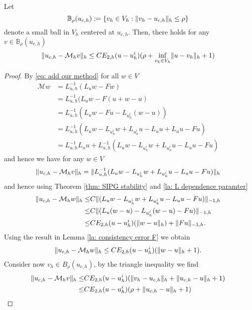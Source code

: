 \begin{lemma} \label{la: mapping property of M}
	Let 
	\[
		\mathbb B_\rho(u_{c,h}):=\{v_h \in V_h: \lVert v_h - u_{c,h} \rVert_{h} \leq \rho\}
	\]
	denote a small ball in $V_h$ centered at $u_{c,h}$. 
	Then, there holds for any $v \in \mathbb B_\rho(u_{c,h})$
	\[
		\lVert u_{c,h} - \mathcal M_h v \rVert_{h} \leq C E_{2,h}(u - u^i_h) (\rho+ \inf_{v_h \in V_h} \lVert u-v_h \rVert_{h}+1)
	\] 
\end{lemma}
\begin{proof}
By \eqref{eq: add our method} for all $w \in V$
\begin{align}
	\mathcal M w &= L_{u,h}^{-1}(L_u w - Fw) \nonumber\\
				 &= L_{u,h}^{-1}(L_u w - F(u+w-u) \nonumber\\
				 &= L_{u,h}^{-1}(L_u w - Fu - L_{u^i_h} (w-u)) \nonumber\\
				 &=  L_{u,h}^{-1}(L_u w - L_{u^i_h} w + L_{u^i_h}u - L_u u + L_u u - Fu) \nonumber\\
				 & = L_{u,h}^{-1} L_u u + L_{u,h}^{-1}(L_u w - L_{u^i_h} w + L_{u^i_h}u - L_u u - Fu) \label{eq: expand M}
 \end{align}	
 and hence we have for any $w \in V$
	\begin{align}
		\lVert u_{c,h} - \mathcal M_h v \rVert_{h} = \lVert L_{u,h}^{-1}(L_u w - L_{u^i_h} w + L_{u^i_h}u - L_u u - Fu) \rVert_{h}
	\end{align}
	and hence using Theorem \ref{thm: SIPG stability} and \ref{la: L dependence paramter}
	\begin{align*}
		\lVert u_{c,h} - \mathcal M_h w \rVert_{h} 
		\leq& C\lVert (L_u w - L_{u^i_h} w + L_{u^i_h} u- L_u u - Fu) \rVert_{-1,h} \nonumber\\
		\leq& C\lVert (L_u (w-u) - L_{u^i_h} (w-u) - Fu) \rVert_{-1,h} \nonumber\\
				\leq& C E_{2,h}(u - u^i_h) (\lVert w-u \rVert_{h}) +\lVert Fu \rVert_{-1,h}.
	\end{align*}
	Using the result in Lemma \ref{la: consistency error F} we obtain
	\begin{align*}
		\lVert u_{c,h} - \mathcal M_h w \rVert_{h} \leq C E_{2,h}(u - u^i_h) (\lVert w-u \rVert_{h}+1).
	\end{align*}
	Consider now $v_h \in B_\rho(u_{c,h})$, by the triangle inequality we find 
	\begin{align}
		\lVert u_{c,h} - \mathcal M_h v \rVert_{h} 
			\leq& C E_{2,h}(u - u^i_h) (\lVert v_h-u_{c,h} \rVert_{h}+ \lVert u_{c,h}-u \rVert_{h} +1) \nonumber \\
			\leq& C E_{2,h}(u - u^i_h) (\rho+ \lVert u_{c,h}-u \rVert_{h} +1)			
	\end{align}
\end{proof}

